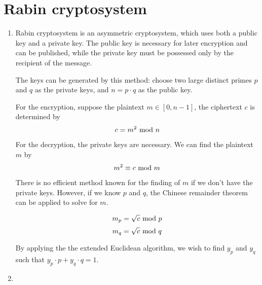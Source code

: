 \documentclass{article}
\renewcommand{\mod}{{\rm\ mod\ }}
\begin{document}
\section{Rabin cryptosystem}
\begin{enumerate}
\item
Rabin cryptosystem is an asymmetric cryptosystem, which uses both a public key and a private key. The public key is necessary for later encryption and can be published, while the private key must be possessed only by the recipient of the message.

The keys can be generated by this method: choose two large distinct primes $p$ and $q$ as the private keys, and $n=p\cdot q$ as the public key.

For the encryption, suppose the plaintext $m\in[0,n-1]$, the ciphertext $c$ is determined by $$c=m^2\mod n$$

For the decryption, the private keys are necessary. We can find the plaintext $m$ by $$m^2\equiv c\mod m$$

There is no efficient method known for the finding of $m$ if we don't have the private keys. However, if we know $p$ and $q$, the Chinese remainder theorem can be applied to solve for $m$.

$$m_p=\sqrt{c}\mod p$$
$$m_q=\sqrt{c}\mod q$$

By applying the the extended Euclidean algorithm, we wish to find $y_{p}$ and $y_{q}$ such that $y_p\cdot p+y_q\cdot q=1$.

\item


\end{enumerate}
\end{document}
